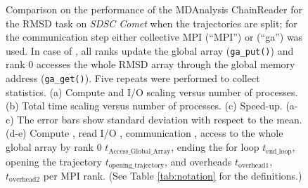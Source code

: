 \begin{figure}[!htb]
\caption{Comparison on the performance of the MDAnalysis ChainReader for the RMSD task on \emph{SDSC Comet} when the trajectories are split; for the communication step either collective MPI (``MPI'') or  (``ga'') was used.
In case of , all ranks update the global array (\texttt{ga\_put()}) and rank 0 accesses the whole RMSD array through the global memory address (\texttt{ga\_get()}).
Five repeats were performed to collect statistics.
(a) Compute and I/O scaling versus number of processes.
(b) Total time scaling versus number of processes.
(c) Speed-up.
(a-c) The error bars show standard deviation with respect to the mean.
(d-e) Compute \tcomp, read I/O \tIO, communication \tcomm, access to the whole global array by rank 0 $t_{\text{Access\_Global\_Array}}$, ending the for loop $t_{\text{end\_loop}}$,  opening the trajectory $t_{\text{opening\_trajectory}}$, and overheads $t_{\text{overhead1}}$, $t_{\text{overhead2}}$ per MPI rank. (See Table \ref{tab:notation} for the definitions.)}
\label{fig:MPIwithIO-split-chain-reader}
\end{figure}

